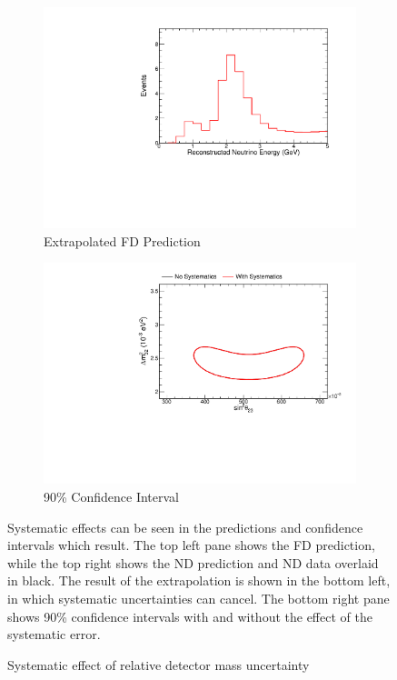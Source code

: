 {\begin{figure}
\begin{center}
\begin{subfigure}[c]{0.49\textwidth}
\includegraphics[width=\textwidth]{figures/systs/prediction/fd_extrap_prediction_massNormRel.pdf}
\caption*{Extrapolated FD Prediction}
\end{subfigure}
\begin{subfigure}[c]{0.49\textwidth}
\includegraphics[width=\textwidth]{figures/systs/prediction/fd_extrap_contour_massNormRel.pdf}
\caption*{90\% Confidence Interval}
\end{subfigure}
\end{center}
\caption{Systematic effect of relative detector mass uncertainty}{
Systematic effects can be seen in the predictions and confidence intervals
which result.
The top left pane shows the FD prediction, while the top right shows the
ND prediction and ND data overlaid in black.
The result of the extrapolation is shown in the bottom left, in which
systematic uncertainties can cancel.
The bottom right pane shows 90\% confidence intervals with and without
the effect of the systematic error.}
\label{syst_fig_massNormRel}


\end{figure}}
